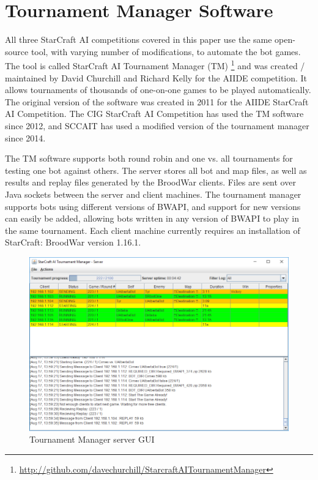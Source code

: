 \section{Tournament Manager Software}\label{secTournamentManagerSoftware}

All three StarCraft AI competitions covered in this paper use the same open-source tool, with varying number of modifications, to automate the bot games. The tool is called StarCraft AI Tournament Manager (TM) \footnote{\url{http://github.com/davechurchill/StarcraftAITournamentManager}} and was created / maintained by David Churchill and Richard Kelly for the AIIDE competition. It allows tournaments of thousands of one-on-one games to be played automatically. The original version of the software was created in 2011 for the AIIDE StarCraft AI Competition. The CIG StarCraft AI Competition has used the TM software since 2012, and SCCAIT has used a modified version of the tournament manager since 2014. 

The TM software supports both round robin and one vs. all tournaments for testing one bot against others. The server stores all bot and map files, as well as results and replay files generated by the BroodWar clients. Files are sent over Java sockets between the server and client machines. The tournament manager supports bots using different versions of BWAPI, and support for new versions can easily be added, allowing bots written in any version of BWAPI to play in the same tournament. Each client machine currently requires an installation of StarCraft: BroodWar version 1.16.1.

\begin{figure}[t]
  \centering
  \includegraphics[width=1\columnwidth]{fig/tournament-manager-screenshot.png}
  \caption{Tournament Manager server GUI}
  \label{tmServerGUI}
\end{figure}

